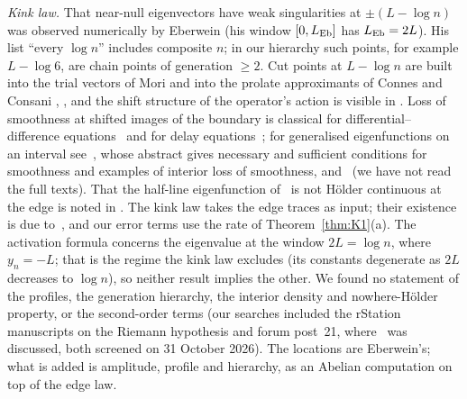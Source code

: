 \documentclass[11pt]{amsart}
\theoremstyle{definition}
\theoremstyle{remark}
\numberwithin{equation}{section}
\begin{document}
\emph{Kink law.} That near-null eigenvectors have weak singularities at $\pm(L-\log n)$ was observed numerically by Eberwein \cite[\S13, p.~45]{Eb} (his window $[0,L_{\rm Eb}]$ has $L_{\rm Eb}=2L$). His list ``every $\log n$'' includes composite $n$; in our hierarchy such points, for example $L-\log6$, are chain points of generation $\ge2$. Cut points at $L-\log n$ are built into the trial vectors of Mori \cite[App.~A]{MoriII} and into the prolate approximants of Connes and Consani \cite[eq.~(3.1)]{CC21}, \cite[\S6.4]{Connes26}, and the shift structure of the operator's action is visible in \cite[eq.~(2.11)]{Suz26}. Loss of smoothness at shifted images of the boundary is classical for differential--difference equations~\cite{Sk97,Sk16} and for delay equations~\cite{BZ03}; for generalised eigenfunctions on an interval see~\cite{VS23}, whose abstract gives necessary and sufficient conditions for smoothness and examples of interior loss of smoothness, and~\cite{VS26} (we have not read the full texts). That the half-line eigenfunction of~\cite{Kw11} is not H\"older continuous at the edge is noted in \cite[Ex.~6.4]{Kw11}. The kink law takes the edge traces as input; their existence is due to~\cite{BT26}, and our error terms use the rate of Theorem~\ref{thm:K1}(a). The activation formula \cite[Thm.~2.4]{BT26} concerns the eigenvalue at the window $2L=\log n$, where $y_n=-L$; that is the regime the kink law excludes (its constants degenerate as $2L$ decreases to $\log n$), so neither result implies the other. We found no statement of the profiles, the generation hierarchy, the interior density and nowhere-H\"older property, or the second-order terms (our searches included the rStation manuscripts on the Riemann hypothesis and forum post~21, where~\cite{BT26} was discussed, both screened on 31 October 2026). The locations are Eberwein's; what is added is amplitude, profile and hierarchy, as an Abelian computation on top of the edge law.
\end{document}
